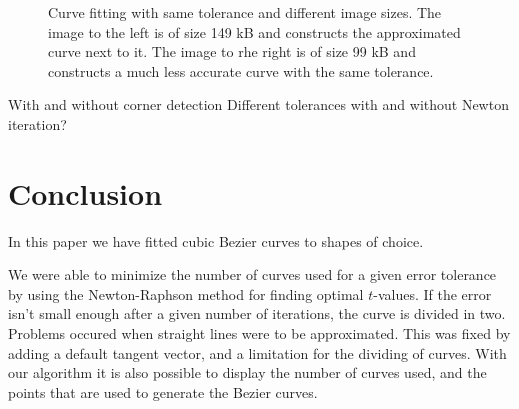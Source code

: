 \documentclass[10pt]{article}
\begin{document}
\begin{figure}
\begin{minipage}[t]{.24\textwidth}
    \label{fig:cornerdet}
\end{minipage}\hfill
\caption{Curve fitting with same tolerance and different image sizes. The image to the left is of size 149 kB and constructs the approximated curve next to it. The image to rhe right is of size 99 kB and constructs a much less accurate curve with the same tolerance.}
\label{fig:mickey}
\end{figure}




With and without corner detection
Different tolerances
with and without Newton iteration?





\section*{Conclusion}
In this paper we have fitted cubic Bezier curves to shapes of choice.

We were able to minimize the number of curves used for a given error tolerance by using the Newton-Raphson method for finding optimal $t$-values. If the error isn't small enough after a given number of iterations, the curve is divided in two. Problems occured when straight lines were to be approximated. This was fixed by adding a default tangent vector, and a limitation for the dividing of curves. With our algorithm it is also possible to display the number of curves used, and the points that are used to generate the Bezier curves.


\cite{Plass:1983}


\end{document}
